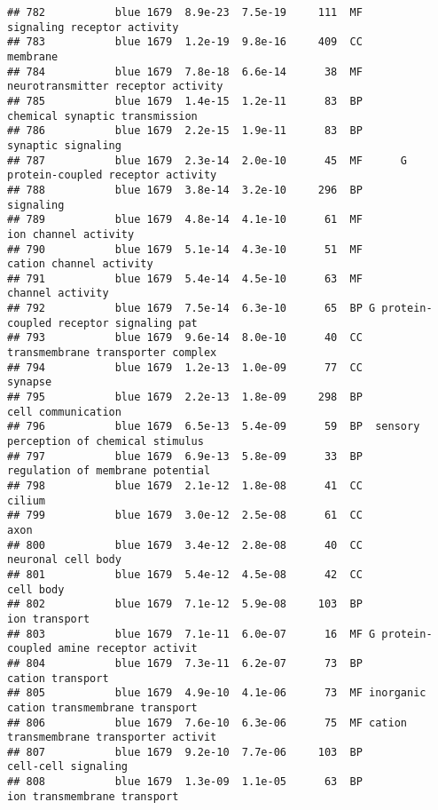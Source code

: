 \documentclass[]{article}
\begin{document}
\begin{verbatim}
## 782           blue 1679  8.9e-23  7.5e-19     111  MF              signaling receptor activity
## 783           blue 1679  1.2e-19  9.8e-16     409  CC                                 membrane
## 784           blue 1679  7.8e-18  6.6e-14      38  MF       neurotransmitter receptor activity
## 785           blue 1679  1.4e-15  1.2e-11      83  BP           chemical synaptic transmission
## 786           blue 1679  2.2e-15  1.9e-11      83  BP                       synaptic signaling
## 787           blue 1679  2.3e-14  2.0e-10      45  MF      G protein-coupled receptor activity
## 788           blue 1679  3.8e-14  3.2e-10     296  BP                                signaling
## 789           blue 1679  4.8e-14  4.1e-10      61  MF                     ion channel activity
## 790           blue 1679  5.1e-14  4.3e-10      51  MF                  cation channel activity
## 791           blue 1679  5.4e-14  4.5e-10      63  MF                         channel activity
## 792           blue 1679  7.5e-14  6.3e-10      65  BP G protein-coupled receptor signaling pat
## 793           blue 1679  9.6e-14  8.0e-10      40  CC        transmembrane transporter complex
## 794           blue 1679  1.2e-13  1.0e-09      77  CC                                  synapse
## 795           blue 1679  2.2e-13  1.8e-09     298  BP                       cell communication
## 796           blue 1679  6.5e-13  5.4e-09      59  BP  sensory perception of chemical stimulus
## 797           blue 1679  6.9e-13  5.8e-09      33  BP         regulation of membrane potential
## 798           blue 1679  2.1e-12  1.8e-08      41  CC                                   cilium
## 799           blue 1679  3.0e-12  2.5e-08      61  CC                                     axon
## 800           blue 1679  3.4e-12  2.8e-08      40  CC                       neuronal cell body
## 801           blue 1679  5.4e-12  4.5e-08      42  CC                                cell body
## 802           blue 1679  7.1e-12  5.9e-08     103  BP                            ion transport
## 803           blue 1679  7.1e-11  6.0e-07      16  MF G protein-coupled amine receptor activit
## 804           blue 1679  7.3e-11  6.2e-07      73  BP                         cation transport
## 805           blue 1679  4.9e-10  4.1e-06      73  MF inorganic cation transmembrane transport
## 806           blue 1679  7.6e-10  6.3e-06      75  MF cation transmembrane transporter activit
## 807           blue 1679  9.2e-10  7.7e-06     103  BP                      cell-cell signaling
## 808           blue 1679  1.3e-09  1.1e-05      63  BP              ion transmembrane transport

\end{verbatim}
\end{document}
